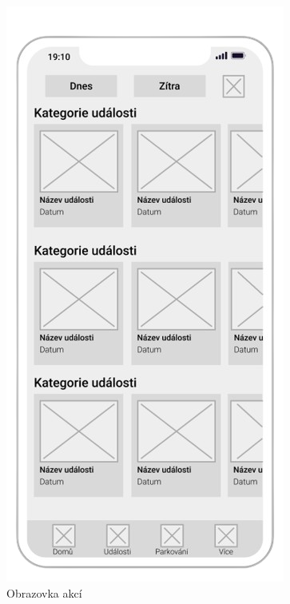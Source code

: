 \begin{figure}[H]
    \endminipage\hfill
      \includegraphics[width=\linewidth]{events_wireframe.png}
      \caption{Obrazovka akcí}\label{fig:screen2}
    \endminipage\hfill
\end{figure}

